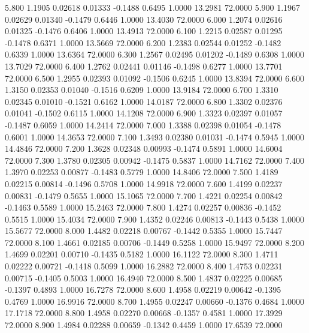    5.800   1.1905   0.02618   0.01333  -0.1488   0.6495   1.0000  13.2981  72.0000
   5.900   1.1967   0.02629   0.01340  -0.1479   0.6446   1.0000  13.4030  72.0000
   6.000   1.2074   0.02616   0.01325  -0.1476   0.6406   1.0000  13.4913  72.0000
   6.100   1.2215   0.02587   0.01295  -0.1478   0.6371   1.0000  13.5669  72.0000
   6.200   1.2383   0.02544   0.01252  -0.1482   0.6339   1.0000  13.6364  72.0000
   6.300   1.2567   0.02495   0.01202  -0.1489   0.6308   1.0000  13.7029  72.0000
   6.400   1.2762   0.02441   0.01146  -0.1498   0.6277   1.0000  13.7701  72.0000
   6.500   1.2955   0.02393   0.01092  -0.1506   0.6245   1.0000  13.8394  72.0000
   6.600   1.3150   0.02353   0.01040  -0.1516   0.6209   1.0000  13.9184  72.0000
   6.700   1.3310   0.02345   0.01010  -0.1521   0.6162   1.0000  14.0187  72.0000
   6.800   1.3302   0.02376   0.01041  -0.1502   0.6115   1.0000  14.1208  72.0000
   6.900   1.3323   0.02397   0.01057  -0.1487   0.6059   1.0000  14.2414  72.0000
   7.000   1.3388   0.02398   0.01054  -0.1478   0.6001   1.0000  14.3653  72.0000
   7.100   1.3493   0.02380   0.01031  -0.1474   0.5945   1.0000  14.4846  72.0000
   7.200   1.3628   0.02348   0.00993  -0.1474   0.5891   1.0000  14.6004  72.0000
   7.300   1.3780   0.02305   0.00942  -0.1475   0.5837   1.0000  14.7162  72.0000
   7.400   1.3970   0.02253   0.00877  -0.1483   0.5779   1.0000  14.8406  72.0000
   7.500   1.4189   0.02215   0.00814  -0.1496   0.5708   1.0000  14.9918  72.0000
   7.600   1.4199   0.02237   0.00831  -0.1479   0.5655   1.0000  15.1065  72.0000
   7.700   1.4221   0.02254   0.00842  -0.1463   0.5589   1.0000  15.2463  72.0000
   7.800   1.4274   0.02257   0.00836  -0.1452   0.5515   1.0000  15.4034  72.0000
   7.900   1.4352   0.02246   0.00813  -0.1443   0.5438   1.0000  15.5677  72.0000
   8.000   1.4482   0.02218   0.00767  -0.1442   0.5355   1.0000  15.7447  72.0000
   8.100   1.4661   0.02185   0.00706  -0.1449   0.5258   1.0000  15.9497  72.0000
   8.200   1.4699   0.02201   0.00710  -0.1435   0.5182   1.0000  16.1122  72.0000
   8.300   1.4711   0.02222   0.00721  -0.1418   0.5099   1.0000  16.2882  72.0000
   8.400   1.4753   0.02231   0.00715  -0.1405   0.5003   1.0000  16.4940  72.0000
   8.500   1.4837   0.02225   0.00685  -0.1397   0.4893   1.0000  16.7278  72.0000
   8.600   1.4958   0.02219   0.00642  -0.1395   0.4769   1.0000  16.9916  72.0000
   8.700   1.4955   0.02247   0.00660  -0.1376   0.4684   1.0000  17.1718  72.0000
   8.800   1.4958   0.02270   0.00668  -0.1357   0.4581   1.0000  17.3929  72.0000
   8.900   1.4984   0.02288   0.00659  -0.1342   0.4459   1.0000  17.6539  72.0000
